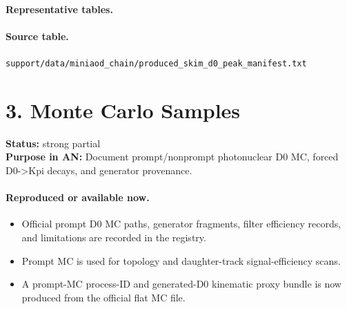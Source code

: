 \documentclass[11pt]{article}
\begin{document}
\paragraph{Representative tables.}
\paragraph{Source table.} \texttt{support/data/miniaod\_chain/produced\_skim\_d0\_peak\_manifest.txt}
\section*{3. Monte Carlo Samples}
\textbf{Status:} strong partial\\
\textbf{Purpose in AN:} Document prompt/nonprompt photonuclear D0 MC, forced D0->Kpi decays, and generator provenance.
\paragraph{Reproduced or available now.}
\begin{itemize}
\item Official prompt D0 MC paths, generator fragments, filter efficiency records, and limitations are recorded in the registry.
\item Prompt MC is used for topology and daughter-track signal-efficiency scans.
\item A prompt-MC process-ID and generated-D0 kinematic proxy bundle is now produced from the official flat MC file.
\end{itemize}
\end{document}
